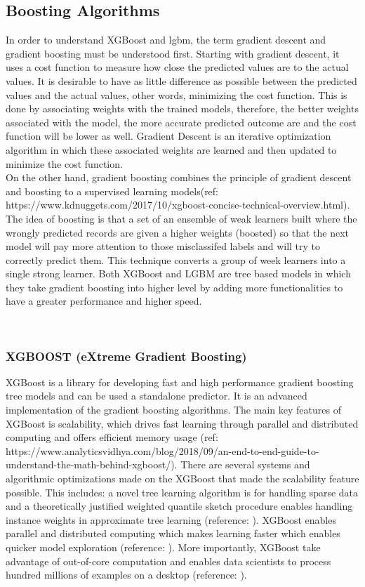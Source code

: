 \documentclass[journal,twoside,web]{ieeecolor}
\begin{document}
\subsection{Boosting Algorithms}
In order to understand XGBoost and lgbm, the term gradient descent and gradient boosting must be understood first. Starting with gradient descent, it uses a cost function to measure how close the predicted values are to the actual values. It is desirable to have as little difference as possible between the predicted values and the actual values, other words, minimizing the cost function. This is done by associating weights with the trained models, therefore, the better weights associated with the model, the more accurate predicted outcome are and the cost function will be lower as well. Gradient Descent is an iterative optimization algorithm in which these associated weights are learned and then updated to minimize the cost function. \\
On the other hand, gradient boosting combines the principle of gradient descent and boosting to a supervised learning models(ref: https://www.kdnuggets.com/2017/10/xgboost-concise-technical-overview.html). The idea of boosting is that a set of an ensemble of weak learners built where the wrongly predicted records are given a higher weights (boosted) so that the next model will pay more attention to those misclassifed labels and will try to correctly predict them. This technique converts a group of week learners into a single strong learner. Both XGBoost and LGBM are tree based models in which they take gradient boosting into higher level by adding more functionalities to have a greater performance and higher speed. 

\\

\subsubsection{XGBOOST (eXtreme Gradient Boosting)}
XGBoost is a library for developing fast and high performance gradient boosting tree models and can be used a standalone predictor. It is an advanced implementation of the gradient boosting algorithms. The main key features of XGBoost is scalability, which drives fast learning through parallel and distributed computing and offers efficient memory usage (ref: https://www.analyticsvidhya.com/blog/2018/09/an-end-to-end-guide-to-understand-the-math-behind-xgboost/). There are several systems and algorithmic optimizations made on the XGBoost that made the scalability feature possible. This includes: a novel tree learning algorithm is for handling sparse data and a theoretically justified weighted quantile sketch procedure enables handling instance weights in approximate tree learning (reference: ). XGBoost enables parallel and distributed computing which makes learning faster which enables quicker model exploration (reference: ). More importantly, XGBoost take advantage of out-of-core computation and enables data scientists to process hundred millions of examples on a desktop (reference: ). 
\end{document}
